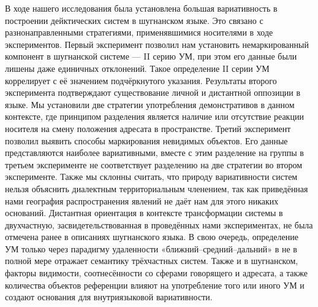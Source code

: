 В ходе нашего исследования была установлена большая вариативность в построении дейктических систем в шугнанском языке. Это связано с разнонаправленными стратегиями, применявшимися носителями в ходе экспериментов. Первый эксперимент позволил нам установить немаркированный компонент в шугнанской системе — II серию УМ, при этом его данные были лишены даже единичных отклонений. Такое определение II серии УМ коррелирует с её значением подчёркнутого указания. Результаты второго эксперимента подтверждают существование личной и дистантной оппозиции в языке. Мы установили две стратегии употребления демонстративов в данном контексте, где принципом разделения является наличие или отсутствие реакции носителя на смену положения адресата в пространстве. Третий эксперимент позволил выявить способы маркирования невидимых объектов. Его данные представляются наиболее вариативными, вместе с этим разделение на группы в третьем эксперименте не соответствует разделению на две стратегии во втором эксперименте. Также мы склонны считать, что природу вариативности систем нельзя объяснить диалектным территориальным членением, так как приведённая нами география распространения явлений не даёт нам для этого никаких оснований. Дистантная ориентация в контексте трансформации системы в двухчастную, засвидетельствованная в проведённых нами экспериментах, не была отмечена ранее в описаниях шугнанского языка. В свою очередь, определение УМ только через парадигму удаленности «ближний–средний–дальний» в не в полной мере отражает семантику трёхчастных систем. Также и в шугнанском, факторы видимости, соотнесённости со сферами говорящего и адресата, а также количества объектов референции влияют на употребление того или иного УМ и создают основания для внутриязыковой вариативности.

